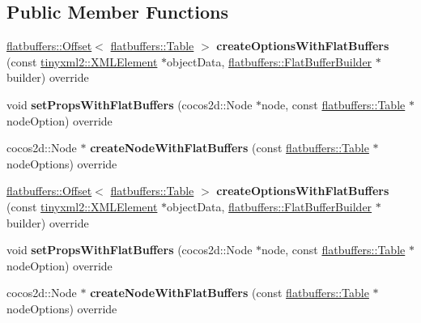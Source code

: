 \subsection*{Public Member Functions}
\begin{DoxyCompactItemize}
\item 
\mbox{\label{classTabControlReader_aea6343197470d6c0e9d3025d658ee81a}} 
\hyperlink{structflatbuffers_1_1Offset}{flatbuffers\+::\+Offset}$<$ \hyperlink{classflatbuffers_1_1Table}{flatbuffers\+::\+Table} $>$ {\bfseries create\+Options\+With\+Flat\+Buffers} (const \hyperlink{classtinyxml2_1_1XMLElement}{tinyxml2\+::\+X\+M\+L\+Element} $\ast$object\+Data, \hyperlink{classflatbuffers_1_1FlatBufferBuilder}{flatbuffers\+::\+Flat\+Buffer\+Builder} $\ast$builder) override
\item 
\mbox{\label{classTabControlReader_af47135fc19e7ac78b1a42cc79619557f}} 
void {\bfseries set\+Props\+With\+Flat\+Buffers} (cocos2d\+::\+Node $\ast$node, const \hyperlink{classflatbuffers_1_1Table}{flatbuffers\+::\+Table} $\ast$node\+Option) override
\item 
\mbox{\label{classTabControlReader_a68432453a546272c882f80282d72d3ce}} 
cocos2d\+::\+Node $\ast$ {\bfseries create\+Node\+With\+Flat\+Buffers} (const \hyperlink{classflatbuffers_1_1Table}{flatbuffers\+::\+Table} $\ast$node\+Options) override
\item 
\mbox{\label{classTabControlReader_a9659dc98a3ff1b3aaf44ae9db9e11fa6}} 
\hyperlink{structflatbuffers_1_1Offset}{flatbuffers\+::\+Offset}$<$ \hyperlink{classflatbuffers_1_1Table}{flatbuffers\+::\+Table} $>$ {\bfseries create\+Options\+With\+Flat\+Buffers} (const \hyperlink{classtinyxml2_1_1XMLElement}{tinyxml2\+::\+X\+M\+L\+Element} $\ast$object\+Data, \hyperlink{classflatbuffers_1_1FlatBufferBuilder}{flatbuffers\+::\+Flat\+Buffer\+Builder} $\ast$builder) override
\item 
\mbox{\label{classTabControlReader_af47135fc19e7ac78b1a42cc79619557f}} 
void {\bfseries set\+Props\+With\+Flat\+Buffers} (cocos2d\+::\+Node $\ast$node, const \hyperlink{classflatbuffers_1_1Table}{flatbuffers\+::\+Table} $\ast$node\+Option) override
\item 
\mbox{\label{classTabControlReader_aab3c6b8e867c0402389423c15f81bc78}} 
cocos2d\+::\+Node $\ast$ {\bfseries create\+Node\+With\+Flat\+Buffers} (const \hyperlink{classflatbuffers_1_1Table}{flatbuffers\+::\+Table} $\ast$node\+Options) override
\end{DoxyCompactItemize}
